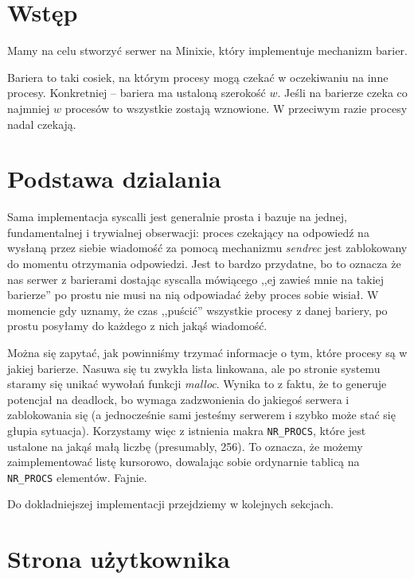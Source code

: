 \section{Wstęp}
Mamy na celu stworzyć serwer na Minixie, który implementuje mechanizm barier.

Bariera to taki cosiek, na którym procesy mogą czekać w oczekiwaniu na inne procesy.
Konkretniej -- bariera ma ustaloną szerokość \( w \). Jeśli na barierze czeka co najmniej \( w \) procesów
to wszystkie zostają wznowione. W przeciwym razie procesy nadal czekają.

\section{Podstawa dzialania}

Sama implementacja syscalli jest generalnie prosta i bazuje na jednej, fundamentalnej i trywialnej obserwacji: proces czekający na odpowiedź na wysłaną przez siebie wiadomość za pomocą mechanizmu \textit{sendrec} jest zablokowany do momentu otrzymania odpowiedzi. Jest to bardzo przydatne, bo to oznacza że nas serwer z barierami dostając syscalla mówiącego ,,ej zawieś mnie na takiej barierze'' po prostu nie musi na nią odpowiadać żeby proces sobie wisiał. W momencie gdy uznamy, że czas ,,puścić'' wszystkie procesy z danej bariery, po prostu posyłamy do każdego z nich jakąś wiadomość.

Można się zapytać, jak powinniśmy trzymać informacje o tym, które procesy są w jakiej barierze. Nasuwa się tu zwykła lista linkowana, ale po stronie systemu staramy się unikać wywołań funkcji \textit{malloc}. Wynika to z faktu, że to generuje potencjał na deadlock, bo wymaga zadzwonienia do jakiegoś serwera i zablokowania się (a jednocześnie sami jesteśmy serwerem i szybko może stać się głupia sytuacja). Korzystamy więc z istnienia makra \texttt{NR\_PROCS}, które jest ustalone na jakąś małą liczbę (presumably, 256). To oznacza, że możemy zaimplementować listę kursorowo, dowalając sobie ordynarnie tablicą na \texttt{NR\_PROCS} elementów. Fajnie.

Do dokladniejszej implementacji przejdziemy w kolejnych sekcjach.

\section{Strona użytkownika}

